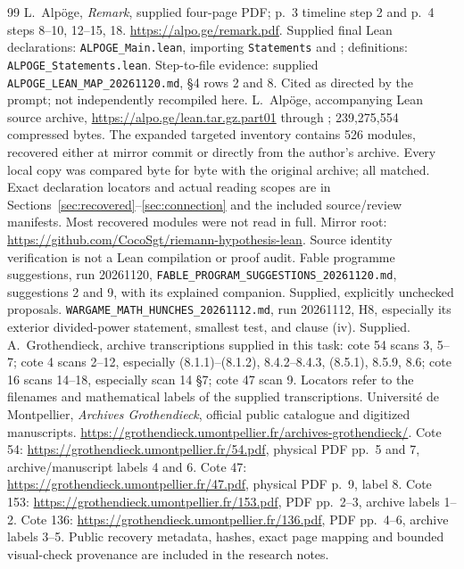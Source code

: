 \documentclass[11pt,a4paper]{article}
\theoremstyle{definition}\newtheorem{remark}[theorem]{Remark}
\begin{document}
\begin{thebibliography}{99}
 L.~Alp\"oge, \emph{Remark}, supplied four-page PDF; p.~3 timeline step 2 and p.~4 steps 8--10, 12--15, 18. \url{https://alpo.ge/remark.pdf}. Supplied final Lean declarations: \texttt{ALPOGE\_Main.lean}, importing \texttt{Statements} and ; definitions: \texttt{ALPOGE\_Statements.lean}. Step-to-file evidence: supplied \texttt{ALPOGE\_LEAN\_MAP\_20261120.md}, \S4 rows 2 and 8. Cited as directed by the prompt; not independently recompiled here.
 L.~Alp\"oge, accompanying Lean source archive, \url{https://alpo.ge/lean.tar.gz.part01} through ; 239,275,554 compressed bytes. The expanded targeted inventory contains 526 modules, recovered either at mirror commit  or directly from the author's archive. Every local copy was compared byte for byte with the original archive; all matched. Exact declaration locators and actual reading scopes are in Sections~\ref{sec:recovered}--\ref{sec:connection} and the included source/review manifests. Most recovered modules were not read in full. Mirror root: \url{https://github.com/CocoSgt/riemann-hypothesis-lean}. Source identity verification is not a Lean compilation or proof audit.
 Fable programme suggestions, run 20261120, \texttt{FABLE\_PROGRAM\_SUGGESTIONS\_20261120.md}, suggestions 2 and 9, with its explained companion. Supplied, explicitly unchecked proposals.
 \texttt{WARGAME\_MATH\_HUNCHES\_20261112.md}, run 20261112, H8, especially its exterior divided-power statement, smallest test, and clause (iv). Supplied.
 A.~Grothendieck, archive transcriptions supplied in this task: cote 54 scans 3, 5--7; cote 4 scans 2--12, especially (8.1.1)--(8.1.2), 8.4.2--8.4.3, (8.5.1), 8.5.9, 8.6; cote 16 scans 14--18, especially scan 14 \S7; cote 47 scan 9. Locators refer to the filenames and mathematical labels of the supplied transcriptions.
 Universit\'e de Montpellier, \emph{Archives Grothendieck}, official public catalogue and digitized manuscripts. \url{https://grothendieck.umontpellier.fr/archives-grothendieck/}. Cote 54: \url{https://grothendieck.umontpellier.fr/54.pdf}, physical PDF pp.~5 and 7, archive/manuscript labels 4 and 6. Cote 47: \url{https://grothendieck.umontpellier.fr/47.pdf}, physical PDF p.~9, label 8. Cote 153: \url{https://grothendieck.umontpellier.fr/153.pdf}, PDF pp.~2--3, archive labels 1--2. Cote 136: \url{https://grothendieck.umontpellier.fr/136.pdf}, PDF pp.~4--6, archive labels 3--5. Public recovery metadata, hashes, exact page mapping and bounded visual-check provenance are included in the research notes.

\end{thebibliography}
\end{document}
